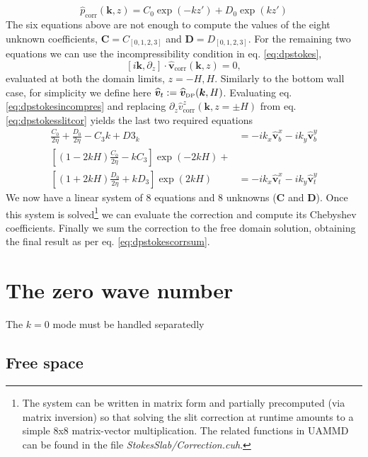 \documentclass[ twoside,openright,titlepage,numbers=noenddot,%
headinclude,footinclude,cleardoublepage=empty,abstract=on,
BCOR=5mm,paper=a4,fontsize=11pt, dvipsnames
]{scrreprt}
\renewcommand{\vec}[1]{\bm{#1}}
\newcommand{\uammd}{\gls{UAMMD}\xspace}
\newcommand{\fou}[1]{\widehat{#1}}
\newcommand{\fvel}{v}
\newcommand{\corr}{\text{corr}}
\newcommand{\dpr}{\text{\tiny DP}}
\begin{document}
\begin{equation}
  \fou{p}_{\corr}(\vec{k}, z) = C_0\exp(-k z') + D_0\exp(k z')
\end{equation}
The six equations above are not enough to compute the values of the eight unknown coefficients, $\vec{C}=C_{[0,1,2,3]}$ and $\vec{D} = D_{[0,1,2,3]}$. For the remaining two equations we can use the incompressibility condition in eq. \eqref{eq:dpstokes},
\begin{equation}
  \label{eq:dpstokesincompres}
  [i\vec{k}, \partial_z] \cdot\fou{\vec{\fvel}}_{\corr}(\vec{k}, z) = 0,
\end{equation}
evaluated at both the domain limits, $z=-H,H$.
Similarly to the bottom wall case, for simplicity we define here $\fou{\vec{\fvel}}_t := \fou{\vec{\fvel}}_{\dpr}(\vec{k}, H)$.
Evaluating eq. \eqref{eq:dpstokesincompres} and replacing $\partial_z\fou{\fvel}_{\corr}^z(\vec{k}, z=\pm H)$ from eq. \eqref{eq:dpstokesslitcor} yields the last two required equations
\begin{equation}
  \begin{aligned}
    \frac{C_0}{2\eta} + \frac{D_0}{2\eta} - C_3k + D3_k &= -ik_x\fou{\vec{\fvel}}_b^x - ik_y\fou{\vec{\fvel}}_b^y\\
    \left[(1-2kH)\frac{C_0}{2\eta}-kC_3\right]\exp(-2kH) +&\\ \left[(1+2kH)\frac{D_0}{2\eta} + kD_3\right]\exp(2kH) &= -ik_x\fou{\vec{\fvel}}_t^x - ik_y\fou{\vec{\fvel}}_t^y
\end{aligned}
\end{equation}
We now have a linear system of 8 equations and 8 unknowns ($\vec{C}$ and $\vec{D}$). Once this system is solved\footnote{The system can be written in matrix form and partially precomputed (via matrix inversion) so that solving the slit correction at runtime amounts to a simple 8x8 matrix-vector multiplication. The related functions in \uammd can be found in the file \emph{StokesSlab/Correction.cuh}.} we can evaluate the correction and compute its Chebyshev coefficients. Finally we sum the correction to the free domain solution, obtaining the final result as per eq. \eqref{eq:dpstokescorrsum}.

\section{The zero wave number}
The $k=0$ mode must be handled separatedly

\subsection*{Free space}
\end{document}

